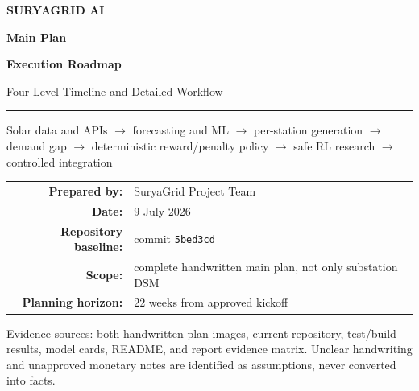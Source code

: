 \documentclass[11pt,a4paper]{article}
\newcommand{\code}[1]{\texttt{\small #1}}
\begin{document}
\begin{titlepage}
\pagecolor{navy}
\color{white}
\vspace*{2.3cm}

{\large\bfseries\textcolor{cyan!35}{SURYAGRID AI}\par}
\vspace{0.45cm}
{\Huge\bfseries Main Plan\par}
\vspace{0.15cm}
{\Huge\bfseries Execution Roadmap\par}
\vspace{0.7cm}
{\Large\textcolor{paleBlue}{Four-Level Timeline and Detailed Workflow}\par}
\vspace{0.9cm}
\textcolor{cyan!55}{\rule{0.86\textwidth}{1.1pt}}
\vspace{0.7cm}

{\large
Solar data and APIs $\rightarrow$ forecasting and ML $\rightarrow$ per-station generation
$\rightarrow$ demand gap $\rightarrow$ deterministic reward/penalty policy
$\rightarrow$ safe RL research $\rightarrow$ controlled integration
\par}

\vfill
\begin{tabular}{@{}rl@{}}
\textbf{Prepared by:} & SuryaGrid Project Team\\[4pt]
\textbf{Date:} & 9 July 2026\\[4pt]
\textbf{Repository baseline:} & commit \code{5bed3cd}\\[4pt]
\textbf{Scope:} & complete handwritten main plan, not only substation DSM\\[4pt]
\textbf{Planning horizon:} & 22 weeks from approved kickoff\\
\end{tabular}

\vspace{1.1cm}
{\small\textcolor{paleBlue}{
Evidence sources: both handwritten plan images, current repository, test/build results,
model cards, README, and report evidence matrix. Unclear handwriting and unapproved monetary
notes are identified as assumptions, never converted into facts.
}\par}
\end{titlepage}
\nopagecolor
\color{ink}

\tableofcontents
\newpage

\end{document}
